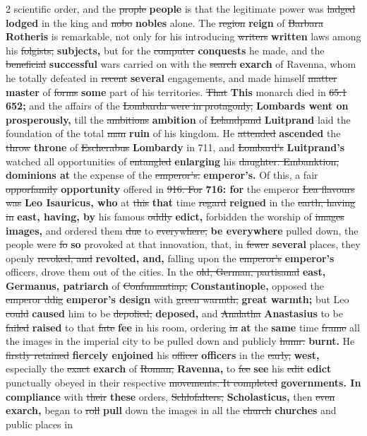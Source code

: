 \documentclass[10pt]{article}
\begin{document}
\begin{multicols}{2}
scientific order, and the \sout{prople} \textbf{people} is that the legitimate power was \sout{ladged} \textbf{lodged} in the king and \sout{nobo} \textbf{nobles} alone. The \sout{region} \textbf{reign} of \sout{Barbara} \textbf{Rotheris} is remarkable, not only for his introducing \sout{writers} \textbf{written} laws among his \sout{folgists,} \textbf{subjects,} but for the \sout{computer} \textbf{conquests} he made, and the \sout{beneficial} \textbf{successful} wars carried on with the \sout{search} \textbf{exarch} of Ravenna, whom he totally defeated in \sout{recent} \textbf{several} engagements, and made himself \sout{matter} \textbf{master} of \sout{forms} \textbf{some} part of his territories. \sout{That} \textbf{This} monarch died in \sout{65:1} \textbf{652;} and the affairs of the \sout{Lombarda were in protagonly,} \textbf{Lombards went on prosperously,} till the \sout{ambitions} \textbf{ambition} of \sout{Lelandpand} \textbf{Luitprand} laid the foundation of the total \sout{man} \textbf{ruin} of his kingdom. He \sout{attended} \textbf{ascended} the \sout{throw} \textbf{throne} of \sout{Escherabus} \textbf{Lombardy} in 711, and \sout{Lombard’s} \textbf{Luitprand's} watched all opportunities of \sout{entangled} \textbf{enlarging} his \sout{daughter. Embanktion,} \textbf{dominions at} the expense of the \sout{emperor’s.} \textbf{emperor's.} Of this, a fair \sout{opporfamily} \textbf{opportunity} offered in \sout{916. For} \textbf{716: for} the emperor \sout{Lea flavours was} \textbf{Leo Isauricus, who} at \sout{this} \textbf{that} time \sout{regard} \textbf{reigned} in the \sout{earth, having in} \textbf{east, having, by} his famous \sout{oddly} \textbf{edict,} forbidden the worship of \sout{images} \textbf{images,} and ordered them \sout{due} to \sout{everywhere,} \textbf{be everywhere} pulled down, the people were \sout{fo} \textbf{so} provoked at that innovation, that, in \sout{fewer} \textbf{several} places, they openly \sout{revoked, and} \textbf{revolted, and,} falling upon the \sout{emperor’s} \textbf{emperor's} officers, drove them out of the cities. In the \sout{old, German, partisanal} \textbf{east, Germanus, patriarch} of \sout{Confumantiap,} \textbf{Constantinople,} opposed the \sout{emperor ddig} \textbf{emperor's design} with \sout{green warmth,} \textbf{great warmth;} but Leo \sout{could} \textbf{caused} him to be \sout{depolied,} \textbf{deposed,} and \sout{Analatha} \textbf{Anastasius} to be \sout{failed} \textbf{raised} to that \sout{fate} \textbf{fee} in his room, ordering \sout{in} \textbf{at} the \textbf{same} time \sout{frame} all the images in the imperial city to be pulled down and publicly \sout{humr.} \textbf{burnt.} He \sout{firstly retained} \textbf{fiercely enjoined} his \sout{officer} \textbf{officers} in the \sout{early,} \textbf{west,} especially the \sout{exact} \textbf{exarch} of \sout{Roman,} \textbf{Ravenna,} to \sout{fee} \textbf{see} his \sout{edit} \textbf{edict} punctually obeyed in their respective \sout{movements. It completed} \textbf{governments. In compliance} with \sout{their} \textbf{these} orders, \sout{Schlofalters,} \textbf{Scholasticus,} then \sout{even} \textbf{exarch,} began to \sout{roll} \textbf{pull} down the images in all the \sout{church} \textbf{churches} and public places in 
\end{multicols}
\end{document}
